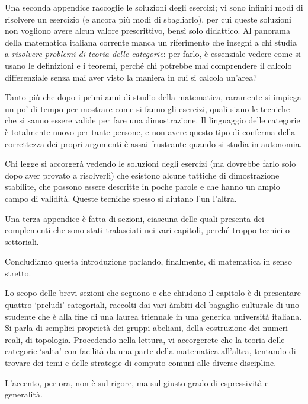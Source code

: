 \medskip
Una seconda appendice raccoglie le soluzioni degli esercizi; vi sono infiniti modi di risolvere un esercizio (e ancora più modi di sbagliarlo), per cui queste soluzioni non vogliono avere alcun valore prescrittivo, bensì solo didattico. Al panorama della matematica italiana corrente manca un riferimento che insegni a chi studia a \emph{risolvere problemi di teoria delle categorie}: per farlo, è essenziale vedere come si usano le definizioni e i teoremi, perché chi potrebbe mai comprendere il calcolo differenziale senza mai aver visto la maniera in cui si calcola un'area?

Tanto più che dopo i primi anni di studio della matematica, raramente si impiega un po' di tempo per mostrare come si fanno gli esercizi, quali siano le tecniche che si sanno essere valide per fare una dimostrazione. Il linguaggio delle categorie è totalmente nuovo per tante persone, e non avere questo tipo di conferma della correttezza dei propri argomenti è assai frustrante quando si studia in autonomia.

Chi legge si accorgerà vedendo le soluzioni degli esercizi (ma dovrebbe farlo solo dopo aver provato a risolverli) che esistono alcune tattiche di dimostrazione stabilite, che possono essere descritte in poche parole e che hanno un ampio campo di validità. Queste tecniche spesso si aiutano l'un l'altra.

\medskip
Una terza appendice è fatta di sezioni, ciascuna delle quali presenta dei complementi che sono stati tralasciati nei vari capitoli, perché troppo tecnici o settoriali.

\medskip
Concludiamo questa introduzione parlando, finalmente, di matematica in senso stretto.

Lo scopo delle brevi sezioni che seguono e che chiudono il capitolo è di presentare quattro `preludi' categoriali, raccolti dai vari àmbiti del bagaglio culturale di uno studente che è alla fine di una laurea triennale in una generica università italiana. Si parla di semplici proprietà dei gruppi abeliani, della costruzione dei numeri reali, di topologia. Procedendo nella lettura, vi accorgerete che la teoria delle categorie `salta' con facilità da una parte della matematica all'altra, tentando di trovare dei temi e delle strategie di computo comuni alle diverse discipline.

L'accento, per ora, non è sul rigore, ma sul giusto grado di espressività e generalità.
